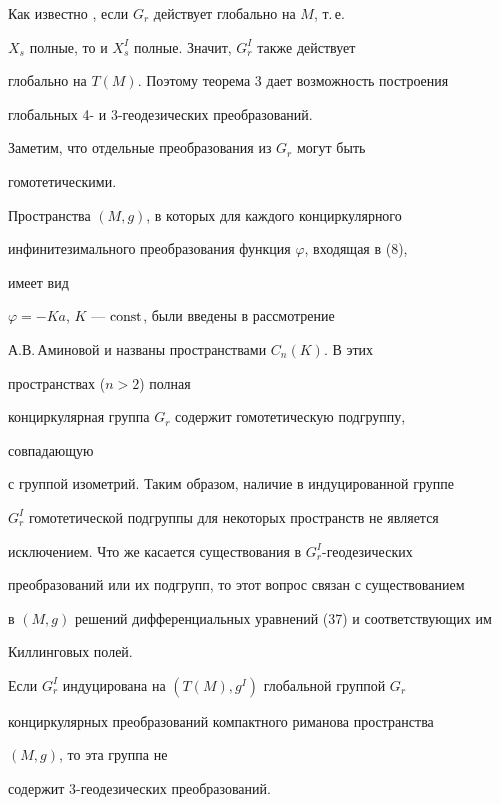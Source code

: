Как известно \cite{5}, если $G_r$ действует глобально на $M$, т.\,е.


$X_s$ полные, то и $X^I_s$ полные. Значит, $G^I_r$ также действует


глобально на $T(M)$. Поэтому теорема 3 дает возможность построения


глобальных 4- и 3-геодезических преобразований.





Заметим, что отдельные преобразования из $G_r$ могут быть


гомотетическими.





Пространства $(M,g)$, в которых для каждого конциркулярного


инфинитезимального преобразования функция $\varphi$, входящая в (8),


имеет вид


$\varphi=-K a$, $K$ --- $\operatorname{const}$, были введены в рассмотрение


А.В.\,Аминовой \cite{13} и названы пространствами $C_n(K)$. В этих


пространствах ($n>2$) полная


конциркулярная группа $G_r$ содержит гомотетическую подгруппу,


совпадающую


с группой изометрий. Таким образом, наличие в индуцированной группе


$G^I_r$ гомотетической подгруппы для некоторых пространств не является


исключением. Что же касается существования в $G^I_r$-геодезических


преобразований или их подгрупп, то этот вопрос связан с существованием


в $(M,g)$ решений дифференциальных уравнений (37) и соответствующих им


Киллинговых полей.





\begin{thm}


Если $G^I_r$ индуцирована на $(T(M),g^I)$ глобальной группой $G_r$


конциркулярных преобразований компактного риманова пространства


$(M,g)$, то эта группа не


содержит $3$-геодезических преобразований.


\end{thm}





